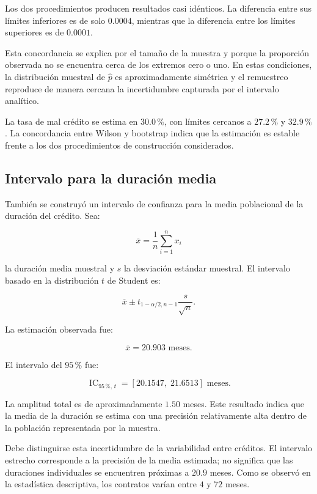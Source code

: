 Los dos procedimientos producen resultados casi idénticos. La diferencia
entre sus límites inferiores es de solo \(0.0004\), mientras que la
diferencia entre los límites superiores es de \(0.0001\).

Esta concordancia se explica por el tamaño de la muestra y porque la
proporción observada no se encuentra cerca de los extremos cero o uno.
En estas condiciones, la distribución muestral de
\(\widehat{p}\) es aproximadamente simétrica y el remuestreo reproduce
de manera cercana la incertidumbre capturada por el intervalo analítico.

\begin{hallazgo}
La tasa de mal crédito se estima en \(30.0\,\%\), con límites cercanos a
\(27.2\,\%\) y \(32.9\,\%\). La concordancia entre Wilson y bootstrap
indica que la estimación es estable frente a los dos procedimientos de
construcción considerados.
\end{hallazgo}

\subsection{Intervalo para la duración media}

También se construyó un intervalo de confianza para la media poblacional
de la duración del crédito. Sea:

\[
\overline{x}
=
\frac{1}{n}
\sum_{i=1}^{n}x_i
\]

la duración media muestral y \(s\) la desviación estándar muestral. El
intervalo basado en la distribución \(t\) de Student es:

\[
\overline{x}
\pm
t_{1-\alpha/2,n-1}
\frac{s}{\sqrt{n}}.
\]

La estimación observada fue:

\[
\overline{x}
=
20.903\text{ meses}.
\]

El intervalo del \(95\,\%\) fue:

\[
\operatorname{IC}_{95\,\%,\,t}
=
[20.1547,\;21.6513]
\text{ meses}.
\]

La amplitud total es de aproximadamente \(1.50\) meses. Este resultado
indica que la media de la duración se estima con una precisión
relativamente alta dentro de la población representada por la muestra.

Debe distinguirse esta incertidumbre de la variabilidad entre créditos.
El intervalo estrecho corresponde a la precisión de la media estimada;
no significa que las duraciones individuales se encuentren próximas a
\(20.9\) meses. Como se observó en la estadística descriptiva, los
contratos varían entre \(4\) y \(72\) meses.

